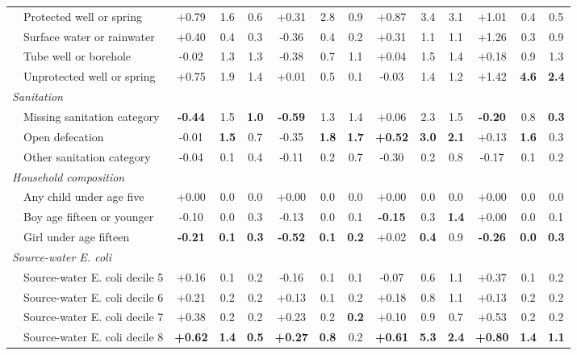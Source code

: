 \begin{landscape}
\begin{table}[p]
\begin{adjustbox}{max width=\textwidth,center}
\begin{tabular}{ll*{12}{c}}
 & Protected well or spring & +0.79 & 1.6 & 0.6 & +0.31 & 2.8 & 0.9 & +0.87 & 3.4 & 3.1 & +1.01 & 0.4 & 0.5 \\
 & Surface water or rainwater & +0.40 & 0.4 & 0.3 & -0.36 & 0.4 & 0.2 & +0.31 & 1.1 & 1.1 & +1.26 & 0.3 & 0.9 \\
 & Tube well or borehole & -0.02 & 1.3 & 1.3 & -0.38 & 0.7 & 1.1 & +0.04 & 1.5 & 1.4 & +0.18 & 0.9 & 1.3 \\
 & Unprotected well or spring & +0.75 & 1.9 & 1.4 & +0.01 & 0.5 & 0.1 & -0.03 & 1.4 & 1.2 & +1.42 & \textbf{4.6} & \textbf{2.4} \\
\multicolumn{14}{l}{\textit{Sanitation}} \\
 & Missing sanitation category & \textbf{-0.44} & 1.5 & \textbf{1.0} & \textbf{-0.59} & 1.3 & 1.4 & +0.06 & 2.3 & 1.5 & \textbf{-0.20} & 0.8 & \textbf{0.3} \\
 & Open defecation & -0.01 & \textbf{1.5} & 0.7 & -0.35 & \textbf{1.8} & \textbf{1.7} & \textbf{+0.52} & \textbf{3.0} & \textbf{2.1} & +0.13 & \textbf{1.6} & 0.3 \\
 & Other sanitation category & -0.04 & 0.1 & 0.4 & -0.11 & 0.2 & 0.7 & -0.30 & 0.2 & 0.8 & -0.17 & 0.1 & 0.2 \\
\multicolumn{14}{l}{\textit{Household composition}} \\
 & Any child under age five & +0.00 & 0.0 & 0.0 & +0.00 & 0.0 & 0.0 & +0.00 & 0.0 & 0.0 & +0.00 & 0.0 & 0.0 \\
 & Boy age fifteen or younger & -0.10 & 0.0 & 0.3 & -0.13 & 0.0 & 0.1 & \textbf{-0.15} & 0.3 & \textbf{1.4} & +0.00 & 0.0 & 0.1 \\
 & Girl under age fifteen & \textbf{-0.21} & \textbf{0.1} & \textbf{0.3} & \textbf{-0.52} & \textbf{0.1} & \textbf{0.2} & +0.02 & \textbf{0.4} & 0.9 & \textbf{-0.26} & \textbf{0.0} & \textbf{0.3} \\
\multicolumn{14}{l}{\textit{Source-water E. coli}} \\
 & Source-water E. coli decile 5 & +0.16 & 0.1 & 0.2 & -0.16 & 0.1 & 0.1 & -0.07 & 0.6 & 1.1 & +0.37 & 0.1 & 0.2 \\
 & Source-water E. coli decile 6 & +0.21 & 0.2 & 0.2 & +0.13 & 0.1 & 0.2 & +0.18 & 0.8 & 1.1 & +0.13 & 0.2 & 0.2 \\
 & Source-water E. coli decile 7 & +0.38 & 0.2 & 0.2 & +0.23 & 0.2 & \textbf{0.2} & +0.10 & 0.9 & 0.7 & +0.53 & 0.2 & 0.2 \\
 & Source-water E. coli decile 8 & \textbf{+0.62} & \textbf{1.4} & \textbf{0.5} & \textbf{+0.27} & \textbf{0.8} & 0.2 & \textbf{+0.61} & \textbf{5.3} & \textbf{2.4} & \textbf{+0.80} & \textbf{1.4} & \textbf{1.1} \\

\end{tabular}
\end{adjustbox}
\end{table}
\end{landscape}
